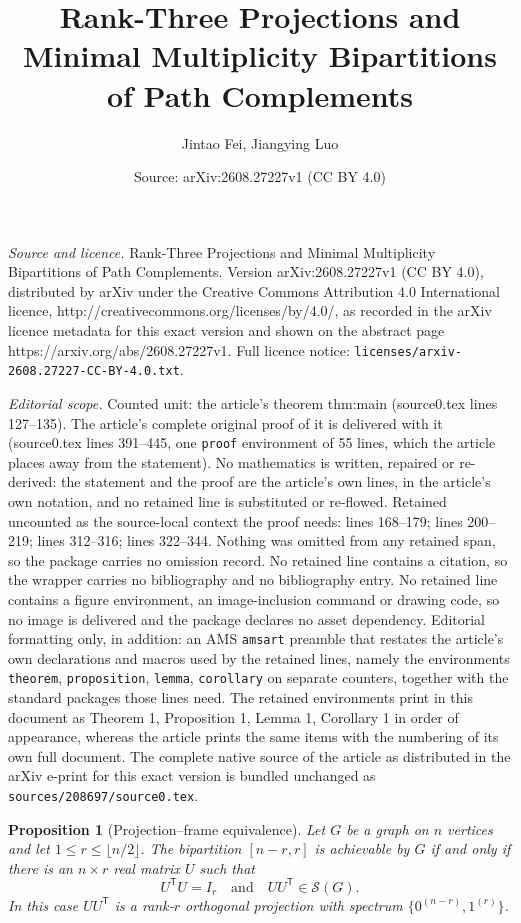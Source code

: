 \documentclass[10pt,a4paper]{amsart}
\title{Rank-Three Projections and Minimal Multiplicity Bipartitions of Path Complements}
\author{Jintao Fei, Jiangying Luo}
\date{Source: arXiv:2608.27227v1 (CC BY 4.0)}
\newtheorem{proposition}{Proposition}
\newcommand{\cS}{\mathcal{S}}
\begin{document}
\maketitle

\noindent\emph{Source and licence.} Rank-Three Projections and Minimal Multiplicity Bipartitions of Path Complements. Version arXiv:2608.27227v1 (CC BY 4.0), distributed by arXiv under the Creative Commons Attribution 4.0 International licence, http://creativecommons.org/licenses/by/4.0/, as recorded in the arXiv licence metadata for this exact version and shown on the abstract page https://arxiv.org/abs/2608.27227v1. Full licence notice: \texttt{licenses/arxiv-2608.27227-CC-BY-4.0.txt}.\par\smallskip

\noindent\textit{Editorial scope.} Counted unit: the article's theorem thm:main (source0.tex lines 127--135). The article's complete original proof of it is delivered with it (source0.tex lines 391--445, one \texttt{proof} environment of 55 lines, which the article places away from the statement). No mathematics is written, repaired or re-derived: the statement and the proof are the article's own lines, in the article's own notation, and no retained line is substituted or re-flowed.  Retained uncounted as the source-local context the proof needs: lines 168--179; lines 200--219; lines 312--316; lines 322--344.  Nothing was omitted from any retained span, so the package carries no omission record.  No retained line contains a citation, so the wrapper carries no bibliography and no bibliography entry.  No retained line contains a figure environment, an image-inclusion command or drawing code, so no image is delivered and the package declares no asset dependency.  Editorial formatting only, in addition: an AMS \texttt{amsart} preamble that restates the article's own declarations and macros used by the retained lines, namely the environments \texttt{theorem}, \texttt{proposition}, \texttt{lemma}, \texttt{corollary} on separate counters, together with the standard packages those lines need.  The retained environments print in this document as Theorem 1, Proposition 1, Lemma 1, Corollary 1 in order of appearance, whereas the article prints the same items with the numbering of its own full document.  The complete native source of the article as distributed in the arXiv e-print for this exact version is bundled unchanged as \texttt{sources/208697/source0.tex}.
\begin{proposition}[Projection--frame equivalence]\label{prop:projection}
Let $G$ be a graph on $n$ vertices and let
$1\le r\le\lfloor n/2\rfloor$.  The bipartition $[n-r,r]$ is achievable by
$G$ if and only if there is an $n\times r$ real matrix $U$ such that
\[
 U^{\mathsf T}U=I_r
 \quad\text{and}\quad
 UU^{\mathsf T}\in\cS(G).
\]
In this case $UU^{\mathsf T}$ is a rank-$r$ orthogonal projection with
spectrum $\{0^{(n-r)},1^{(r)}\}$.
\end{proposition}
\end{document}
